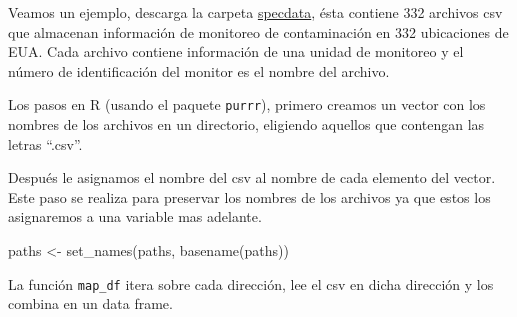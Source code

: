 \documentclass[
]{book}
\newenvironment{Shaded}{\begin{snugshade}}{\end{snugshade}}
\newcommand{\AttributeTok}[1]{\textcolor[rgb]{0.77,0.63,0.00}{#1}}
\newcommand{\ConstantTok}[1]{\textcolor[rgb]{0.00,0.00,0.00}{#1}}
\newcommand{\FunctionTok}[1]{\textcolor[rgb]{0.00,0.00,0.00}{#1}}
\newcommand{\NormalTok}[1]{#1}
\newcommand{\OtherTok}[1]{\textcolor[rgb]{0.56,0.35,0.01}{#1}}
\newcommand{\SpecialCharTok}[1]{\textcolor[rgb]{0.00,0.00,0.00}{#1}}
\newcommand{\StringTok}[1]{\textcolor[rgb]{0.31,0.60,0.02}{#1}}
\begin{document}
Veamos un ejemplo, descarga la carpeta
\href{https://www.dropbox.com/sh/c0mgho95gwjc1mv/AACVLPr33O6ENW68xmL7hyUna?dl=0}{specdata},
ésta contiene 332 archivos csv que almacenan información de monitoreo de
contaminación en 332 ubicaciones de EUA. Cada archivo contiene información de
una unidad de monitoreo y el número de identificación del monitor es el nombre
del archivo.

Los pasos en R (usando el paquete \texttt{purrr}), primero creamos un vector con los
nombres de los archivos en un directorio, eligiendo aquellos que contengan las
letras ``.csv''.

\begin{Shaded}
\end{Shaded}

Después le asignamos el nombre del csv al nombre de cada elemento del vector.
Este paso se realiza para preservar los nombres de los archivos ya que estos
los asignaremos a una variable mas adelante.

\begin{Shaded}
\begin{Highlighting}[]
\NormalTok{paths }\OtherTok{\textless{}{-}} \FunctionTok{set\_names}\NormalTok{(paths, }\FunctionTok{basename}\NormalTok{(paths))}
\end{Highlighting}
\end{Shaded}

La función \texttt{map\_df} itera sobre cada dirección, lee el csv en dicha dirección y
los combina en un data frame.
\end{document}
